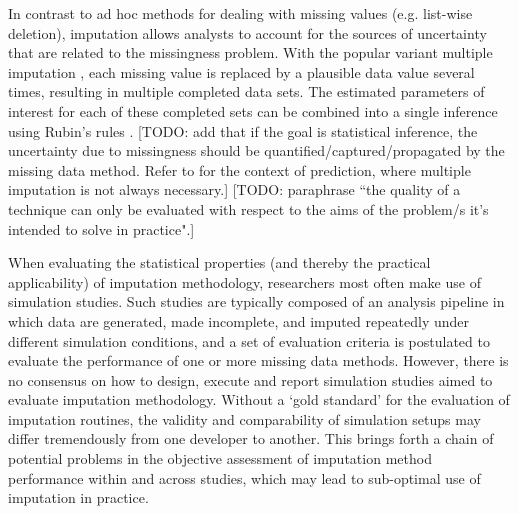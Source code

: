 \documentclass[bimj,fleqn]{w-art}
\begin{document}
In contrast to ad hoc methods for dealing with missing values (e.g. list-wise deletion), imputation allows analysts to account for the sources of uncertainty that are related to the missingness problem. With the popular variant multiple imputation \citep{rubi76}, each missing value is replaced by a plausible data value several times, resulting in multiple completed data sets. The estimated parameters of interest for each of these completed sets can be combined into a single inference using Rubin's rules \citep[][p. 76]{rubi87}. [TODO: add that if the goal is statistical inference, the uncertainty due to missingness should be quantified/captured/propagated by the missing data method. Refer to \citet{sper20} for the context of prediction, where multiple imputation is not always necessary.] [TODO: paraphrase ``the quality of a technique can only be evaluated with respect to the aims of the problem/s it's intended to solve in practice".] 

When evaluating the statistical properties (and thereby the practical applicability) of imputation methodology, researchers most often make use of simulation studies. Such studies are typically composed of an analysis pipeline in which data are generated, made incomplete, and imputed repeatedly under different simulation conditions, and a set of evaluation criteria is postulated to evaluate the performance of one or more missing data methods. However, there is no consensus on how to design, execute and report simulation studies aimed to evaluate imputation methodology. Without a `gold standard' for the evaluation of imputation routines, the validity and comparability of simulation setups may differ tremendously from one developer to another. This brings forth a chain of potential problems in the objective assessment of imputation method performance within and across studies, which may lead to sub-optimal use of imputation in practice.

\end{document}
